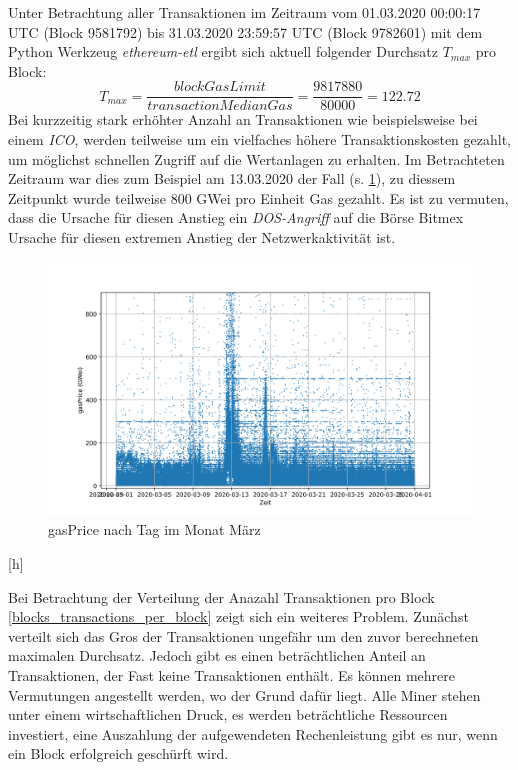 \documentclass[runningheads]{llncs}
\begin{document}
Unter Betrachtung aller Transaktionen im Zeitraum vom 01.03.2020 00:00:17 UTC (Block 9581792) bis 31.03.2020 23:59:57 UTC (Block 9782601) mit dem Python Werkzeug \textit{ethereum-etl} \cite{noauthor_blockchain-etl/ethereum-etl_2020} ergibt sich aktuell folgender Durchsatz $ T_{max} $ pro Block: \cite{neemann_appendix_nodate}
$$
  T_{max} = \frac{\textit{blockGasLimit}}{\textit{transactionMedianGas}} = \frac{9817880}{80000} = 122.72
$$
Bei kurzzeitig stark erhöhter Anzahl an Transaktionen wie beispielsweise bei einem \textit{ICO}, werden teilweise um ein vielfaches höhere Transaktionskosten gezahlt, um möglichst schnellen Zugriff auf die Wertanlagen zu erhalten. \cite[S. 9:6 f.]{m.spain_oasics-tokeneconomics_2019} Im Betrachteten Zeitraum war dies zum Beispiel am 13.03.2020 der Fall (s. \ref{transactions_gasprice_timeseries}), zu diessem Zeitpunkt wurde teilweise 800 GWei pro Einheit Gas gezahlt. Es ist zu vermuten, dass die Ursache für diesen Anstieg ein \textit{DOS-Angriff} auf die Börse Bitmex Ursache für diesen extremen Anstieg der Netzwerkaktivität ist. \cite{bitmex_ddos_nodate}
\begin{figure}
  \includegraphics[width=\textwidth, keepaspectratio]{transactions_gasprice_timeseries.png}
  \caption{gasPrice nach Tag im Monat März \cite{neemann_appendix_nodate}}
  \label{transactions_gasprice_timeseries}
\end{figure}[h]

Bei Betrachtung der Verteilung der Anazahl Transaktionen pro Block \ref{blocks_transactions_per_block} zeigt sich ein weiteres Problem. Zunächst verteilt sich das Gros der Transaktionen ungefähr um den zuvor berechneten maximalen Durchsatz. Jedoch gibt es einen beträchtlichen Anteil an Transaktionen, der Fast keine Transaktionen enthält. Es können mehrere Vermutungen angestellt werden, wo der Grund dafür liegt. Alle Miner stehen unter einem wirtschaftlichen Druck, es werden beträchtliche Ressourcen investiert, eine Auszahlung der aufgewendeten Rechenleistung gibt es nur, wenn ein Block erfolgreich geschürft wird. \cite{research_empty_nodate}
\end{document}
